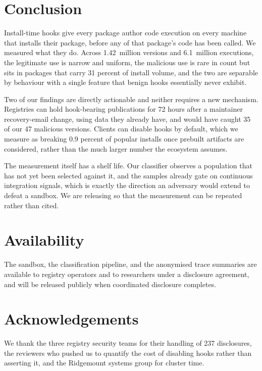 \section{Conclusion}
\label{sec:conclusion}

Install-time hooks give every package author code execution on every machine
that installs their package, before any of that package's code has been called.
We measured what they do. Across 1.42~million versions and 6.1~million
executions, the legitimate use is narrow and uniform, the malicious use is rare
in count but sits in packages that carry 31 percent of install volume, and the
two are separable by behaviour with a single feature that benign hooks
essentially never exhibit.

Two of our findings are directly actionable and neither requires a new
mechanism. Registries can hold hook-bearing publications for 72 hours after a
maintainer recovery-email change, using data they already have, and would have
caught 35 of our 47 malicious versions. Clients can disable hooks by default,
which we measure as breaking 0.9 percent of popular installs once prebuilt
artifacts are considered, rather than the much larger number the ecosystem
assumes.

The measurement itself has a shelf life. Our classifier observes a population
that has not yet been selected against it, and the samples already gate on
continuous integration signals, which is exactly the direction an adversary
would extend to defeat a sandbox. We are releasing \tool{} so that the
measurement can be repeated rather than cited.

\section*{Availability}
The \tool{} sandbox, the classification pipeline, and the anonymised trace
summaries are available to registry operators and to researchers under a
disclosure agreement, and will be released publicly when coordinated disclosure
completes.

\section*{Acknowledgements}
We thank the three registry security teams for their handling of 237
disclosures, the reviewers who pushed us to quantify the cost of disabling
hooks rather than asserting it, and the Ridgemount systems group for cluster
time.
